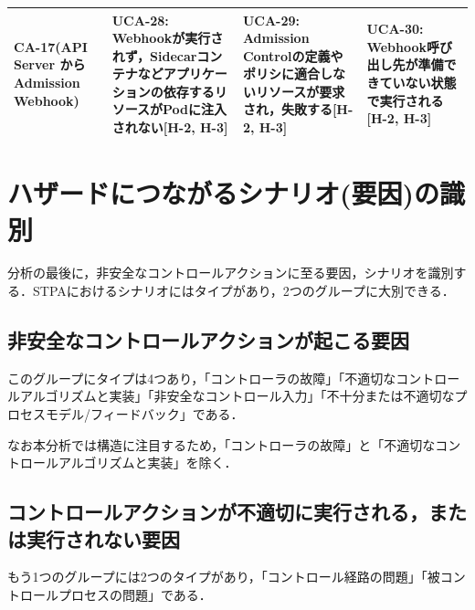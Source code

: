 \documentclass[12pt,a4j]{ujreport}
\begin{document}
\begin{footnotesize}
\begin{tabularx}{\linewidth}{
            >{\hsize=0.7\hsize}X|
            >{\hsize=1.1\hsize}X|
            >{\hsize=1.1\hsize}X|
            >{\hsize=1.1\hsize}X
        }
        CA-17(API Server から Admission Webhook)                      & UCA-28: Webhookが実行されず，Sidecarコンテナなどアプリケーションの依存するリソースがPodに注入されない[H-2, H-3]                                                                                                                                                                                                                                                                                                                                                                                            & UCA-29: Admission Controlの定義やポリシに適合しないリソースが要求され，失敗する[H-2, H-3]                                                                                                                                                                                                                                       & UCA-30: Webhook呼び出し先が準備できていない状態で実行される[H-2, H-3]                                                                \\ \hline
    \end{tabularx}
\end{footnotesize}

\section{ハザードにつながるシナリオ(要因)の識別}
分析の最後に，非安全なコントロールアクションに至る要因，シナリオを識別する．STPAにおけるシナリオにはタイプがあり，2つのグループに大別できる．

\subsection{非安全なコントロールアクションが起こる要因}
このグループにタイプは4つあり，「コントローラの故障」「不適切なコントロールアルゴリズムと実装」「非安全なコントロール入力」「不十分または不適切なプロセスモデル/フィードバック」である．

なお本分析では構造に注目するため，「コントローラの故障」と「不適切なコントロールアルゴリズムと実装」を除く．

\subsection{コントロールアクションが不適切に実行される，または実行されない要因}
もう1つのグループには2つのタイプがあり，「コントロール経路の問題」「被コントロールプロセスの問題」である．
\end{document}
